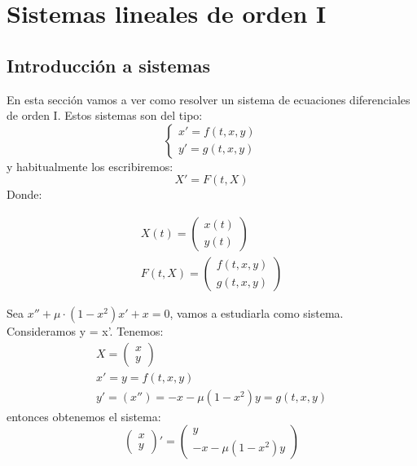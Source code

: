 \chapter{Sistemas lineales de orden I}
\section{Introducci\'{o}n a sistemas}
En esta sección vamos a ver como resolver un sistema de ecuaciones diferenciales de orden I. Estos sistemas son del tipo:
$$
\begin{cases}
    x' = f(t, x, y)\\
    y' = g(t, x, y)
\end{cases}
$$
y habitualmente los escribiremos:
$$
X' = F(t, X)
$$ Donde:

\begin{gather*}
X(t) =
\left(
\begin{matrix}
    x(t)\\
    y(t)
\end{matrix}
\right)\\
F(t, X) =
\left(
\begin{matrix}
    f(t, x, y)\\
    g(t, x, y)
\end{matrix}
\right)
\end{gather*}

\begin{eg}
    Sea $x'' + \mu\cdot (1-x^2)x' + x = 0$, vamos a estudiarla como sistema.\\
    Consideramos y = x'. Tenemos:
    \begin{gather*}
        X = \left(\begin{matrix}
            x\\
            y
    \end{matrix}
    \right) \\
    x' = y = f(t, x, y) \\
    y' = (x'') = -x -\mu (1-x^2)y = g(t, x, y)
    \end{gather*}
    entonces obtenemos el sistema:
    $$\left(
        \begin{matrix}
            x\\
            y
        \end{matrix}\right)' =
        \left(
        \begin{matrix}
            y \\
            -x -\mu (1-x^2)y
        \end{matrix}\right)
    $$
\end{eg}

